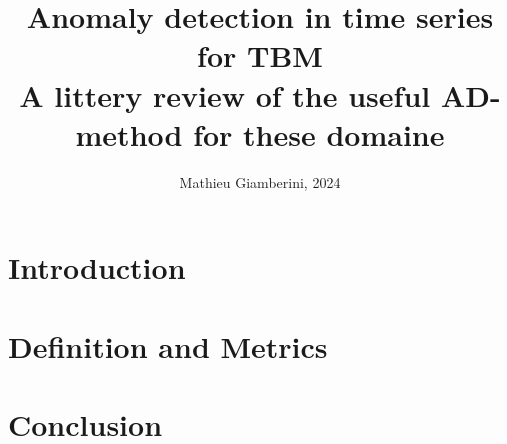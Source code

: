 \documentclass{article}
\title{Anomaly detection in time series for TBM \\ \small{A littery review of the useful AD-method for these domaine}}
\author{Mathieu Giamberini, 2024}
\date{}
\begin{document}
    \maketitle
    \begin{abstract}
        
    \end{abstract}
    
    \section*{Introduction}
    \section{Definition and Metrics}
    
    \section*{Conclusion}
\end{document}
